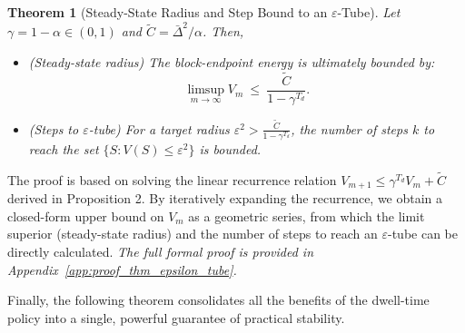 \documentclass[journal]{IEEEtran}
\newtheorem{theorem}{Theorem}
\begin{document}
\begin{theorem}[Steady-State Radius and Step Bound to an $\varepsilon$-Tube]
\label{thm:epsilon_tube}
Let $\gamma=1-\alpha\in(0,1)$ and $\tilde C=\bar\Delta^2/\alpha$. Then,
\begin{itemize}
    \item[\textit{(a)}] (Steady-state radius) The block-endpoint energy is ultimately bounded by:
    \begin{equation}\label{eq:limsup_radius}
    \limsup_{m\to\infty}V_m\ \le\ \frac{\tilde C}{1-\gamma^{T_d}}.
    \end{equation}
    \item[\textit{(b)}] (Steps to $\varepsilon$-tube) For a target radius $\varepsilon^2 > \frac{\tilde C}{1-\gamma^{T_d}}$, the number of steps $k$ to reach the set $\{S: V(S)\le \varepsilon^2\}$ is bounded.
\end{itemize}
\end{theorem}
\begin{IEEEproof}
The proof is based on solving the linear recurrence relation $V_{m+1}\le \gamma^{T_d}V_m+\tilde C$ derived in Proposition 2. By iteratively expanding the recurrence, we obtain a closed-form upper bound on $V_m$ as a geometric series, from which the limit superior (steady-state radius) and the number of steps to reach an $\varepsilon$-tube can be directly calculated.
\textit{The full formal proof is provided in Appendix~\ref{app:proof_thm_epsilon_tube}.}
\end{IEEEproof}

Finally, the following theorem consolidates all the benefits of the dwell-time policy into a single, powerful guarantee of practical stability.
\end{document}
